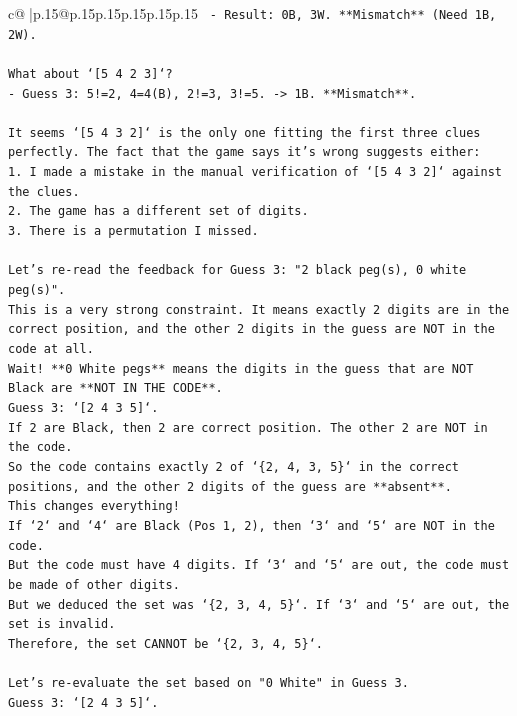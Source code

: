 \documentclass{article}
\begin{document}
{\begin{supertabular}{c@{$\;$}|p{.15\linewidth}@{}p{.15\linewidth}p{.15\linewidth}p{.15\linewidth}p{.15\linewidth}p{.15\linewidth}}
{{{\texttt{    {-} Result: 0B, 3W. **Mismatch** (Need 1B, 2W).} \\
\\ 
\texttt{What about `{[}5 4 2 3{]}`?} \\
\texttt{{-} Guess 3: 5!=2, 4=4(B), 2!=3, 3!=5. {-}> 1B. **Mismatch**.} \\
\\ 
\texttt{It seems `{[}5 4 3 2{]}` is the only one fitting the first three clues perfectly. The fact that the game says it's wrong suggests either:} \\
\texttt{1.  I made a mistake in the manual verification of `{[}5 4 3 2{]}` against the clues.} \\
\texttt{2.  The game has a different set of digits.} \\
\texttt{3.  There is a permutation I missed.} \\
\\ 
\texttt{Let's re{-}read the feedback for Guess 3: "2 black peg(s), 0 white peg(s)".} \\
\texttt{This is a very strong constraint. It means exactly 2 digits are in the correct position, and the other 2 digits in the guess are NOT in the code at all.} \\
\texttt{Wait! **0 White pegs** means the digits in the guess that are NOT Black are **NOT IN THE CODE**.} \\
\texttt{Guess 3: `{[}2 4 3 5{]}`.} \\
\texttt{If 2 are Black, then 2 are correct position. The other 2 are NOT in the code.} \\
\texttt{So the code contains exactly 2 of `\{2, 4, 3, 5\}` in the correct positions, and the other 2 digits of the guess are **absent**.} \\
\texttt{This changes everything!} \\
\texttt{If `2` and `4` are Black (Pos 1, 2), then `3` and `5` are NOT in the code.} \\
\texttt{But the code must have 4 digits. If `3` and `5` are out, the code must be made of other digits.} \\
\texttt{But we deduced the set was `\{2, 3, 4, 5\}`. If `3` and `5` are out, the set is invalid.} \\
\texttt{Therefore, the set CANNOT be `\{2, 3, 4, 5\}`.} \\
\\ 
\texttt{Let's re{-}evaluate the set based on "0 White" in Guess 3.} \\
\texttt{Guess 3: `{[}2 4 3 5{]}`.} \\
}}}
\end{supertabular}}
\end{document}
